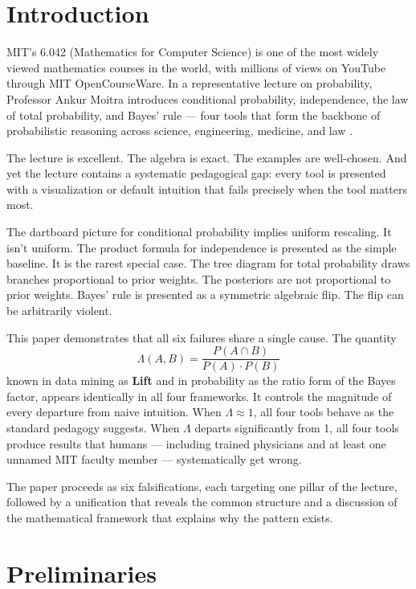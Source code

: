 \documentclass[12pt]{article}
\begin{document}
\newpage

\section{Introduction}

MIT's 6.042 (Mathematics for Computer Science) is one of the most widely viewed mathematics courses in the world, with millions of views on YouTube through MIT OpenCourseWare. In a representative lecture on probability, Professor Ankur Moitra introduces conditional probability, independence, the law of total probability, and Bayes' rule --- four tools that form the backbone of probabilistic reasoning across science, engineering, medicine, and law \cite{moitra2024}.

The lecture is excellent. The algebra is exact. The examples are well-chosen. And yet the lecture contains a systematic pedagogical gap: every tool is presented with a visualization or default intuition that fails precisely when the tool matters most.

The dartboard picture for conditional probability implies uniform rescaling. It isn't uniform. The product formula for independence is presented as the simple baseline. It is the rarest special case. The tree diagram for total probability draws branches proportional to prior weights. The posteriors are not proportional to prior weights. Bayes' rule is presented as a symmetric algebraic flip. The flip can be arbitrarily violent.

This paper demonstrates that all six failures share a single cause. The quantity
\begin{equation}
\Lambda(A,B) = \frac{P(A \cap B)}{P(A) \cdot P(B)}
\end{equation}
known in data mining as \textbf{Lift} and in probability as the ratio form of the Bayes factor, appears identically in all four frameworks. It controls the magnitude of every departure from naive intuition. When $\Lambda \approx 1$, all four tools behave as the standard pedagogy suggests. When $\Lambda$ departs significantly from 1, all four tools produce results that humans --- including trained physicians and at least one unnamed MIT faculty member --- systematically get wrong.

The paper proceeds as six falsifications, each targeting one pillar of the lecture, followed by a unification that reveals the common structure and a discussion of the mathematical framework that explains why the pattern exists.

\section{Preliminaries}
\end{document}

